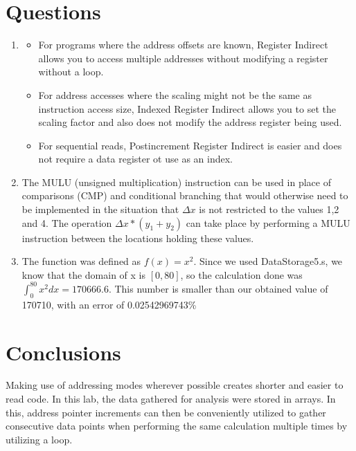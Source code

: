 \documentclass[12pt]{article}
\begin{document}
\section{Questions}
 \begin{enumerate}
     \item \begin{itemize}
         \item For programs where the address offsets are known, Register Indirect allows you to access multiple addresses without modifying a register without a loop.
         \item For address accesses where the scaling might not be the same as instruction access size, Indexed Register Indirect allows you to set the scaling factor and also does not modify the address register being used.
         \item For sequential reads, Postincrement Register Indirect is easier and does not require a data register ot use as an index.
     \end{itemize}
     
     \item The MULU (unsigned multiplication) instruction can be used in place of comparisons (CMP) and conditional branching that would otherwise need to be implemented in the situation that $ \Delta x$ is not restricted to the values 1,2 and 4. The operation $\Delta x * (y_1 + y_2)$ can take place by performing a MULU instruction between the locations holding these values.
     
     \item The function was defined as $f(x) = x^2$. Since we used DataStorage5.s, we know that the domain of x is $[0, 80]$, so the calculation done was $\int_{0}^{80} x^2 dx = \num{170666.6}$. This number is smaller than our obtained value of \num{170710}, with an error of \num[round-mode = figures, round-precision=2]{0.02542969743}\%
\end{enumerate}

\section{Conclusions}
    Making use of addressing modes wherever possible creates shorter and easier to read code.  In this lab, the data gathered for analysis were stored in arrays. In this, address pointer increments can then be conveniently utilized to gather consecutive data points when performing the same calculation multiple times by utilizing a loop.
    
\end{document}
